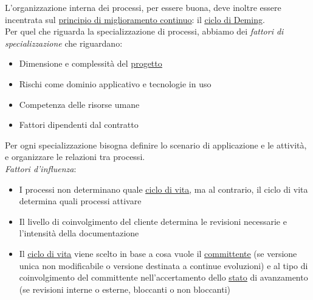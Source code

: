 		L'organizzazione interna dei processi, per essere buona, deve inoltre essere incentrata sul \underline{\hyperref[miglioramentocontinuo]{principio di miglioramento continuo}}: il \underline{\hyperref[pdca]{ciclo di Deming}}. \\
		Per quel che riguarda la specializzazione di processi,
		abbiamo dei \textit{fattori di specializzazione} che riguardano:
		\begin{itemize}
			\item Dimensione e complessità del \underline{\hyperref[progetto]{progetto}}
			\item Rischi come dominio applicativo e tecnologie in uso
			\item Competenza delle risorse umane
			\item Fattori dipendenti dal contratto
		\end{itemize}
		Per ogni specializzazione bisogna definire lo scenario di applicazione e le attività, e organizzare le relazioni tra processi. \\
		\textit{Fattori d'influenza}:
			\begin{itemize}
				\item I processi non determinano quale \underline{\hyperref[ciclo]{ciclo di vita}}, ma al contrario, il ciclo di vita determina quali processi attivare
				\item Il livello di coinvolgimento del cliente determina le revisioni necessarie e l'intensità della documentazione
				\item Il \underline{\hyperref[ciclo]{ciclo di vita}} viene scelto in base a cosa vuole il \underline{\hyperref[committente]{committente}} (se versione unica non modificabile o versione destinata a continue evoluzioni) e al tipo di coinvolgimento del committente nell'accertamento dello \underline{\hyperref[stato]{stato}} di avanzamento (se revisioni interne o esterne, bloccanti o non bloccanti)
			\end{itemize}


